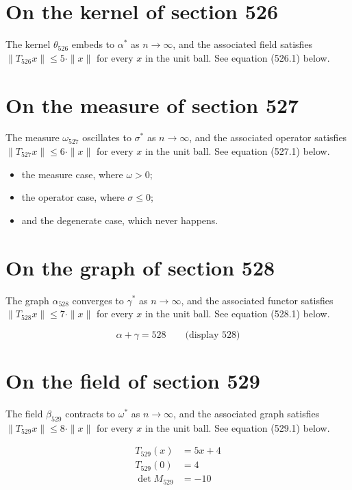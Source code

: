 \documentclass{article}
\begin{document}
\section{On the kernel of section 526}
The kernel $\theta_{526}$ embeds to $\alpha^{*}$ as $n \to \infty$,
and the associated field satisfies $\|T_{526} x\| \leq 5 \cdot \|x\|$
for every $x$ in the unit ball. See equation (526.1) below.

\section{On the measure of section 527}
The measure $\omega_{527}$ oscillates to $\sigma^{*}$ as $n \to \infty$,
and the associated operator satisfies $\|T_{527} x\| \leq 6 \cdot \|x\|$
for every $x$ in the unit ball. See equation (527.1) below.

\begin{itemize}
  \item the measure case, where $\omega > 0$;
  \item the operator case, where $\sigma \leq 0$;
  \item and the degenerate case, which never happens.
\end{itemize}

\section{On the graph of section 528}
The graph $\alpha_{528}$ converges to $\gamma^{*}$ as $n \to \infty$,
and the associated functor satisfies $\|T_{528} x\| \leq 7 \cdot \|x\|$
for every $x$ in the unit ball. See equation (528.1) below.

$$
\alpha + \gamma = 528 \qquad \text{(display 528)}
$$

\section{On the field of section 529}
The field $\beta_{529}$ contracts to $\omega^{*}$ as $n \to \infty$,
and the associated graph satisfies $\|T_{529} x\| \leq 8 \cdot \|x\|$
for every $x$ in the unit ball. See equation (529.1) below.

\begin{align}
T_{529}(x) &= 5 x + 4 \\
T_{529}(0) &= 4 \\
\det M_{529} &= -10
\end{align}
\end{document}

